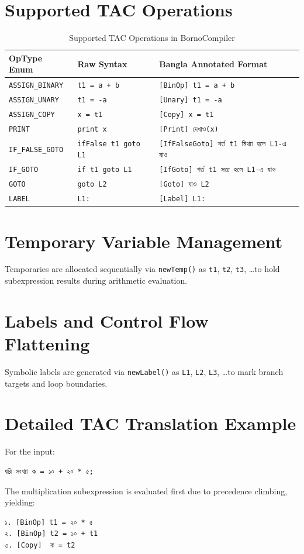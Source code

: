 \documentclass[12pt, a4paper]{report}
\begin{document}
\section{Supported TAC Operations}
\begin{table}[htbp]
\centering
\small
\renewcommand{\arraystretch}{1.25}
\begin{tabular}{|l|l|l|}
\hline
\textbf{OpType Enum} & \textbf{Raw Syntax} & \textbf{Bangla Annotated Format} \\
\hline
\texttt{ASSIGN\_BINARY} & \texttt{t1 = a + b} & \texttt{[BinOp] t1 = a + b} \\
\hline
\texttt{ASSIGN\_UNARY} & \texttt{t1 = -a} & \texttt{[Unary] t1 = -a} \\
\hline
\texttt{ASSIGN\_COPY} & \texttt{x = t1} & \texttt{[Copy] x = t1} \\
\hline
\texttt{PRINT} & \texttt{print x} & \texttt{[Print] দেখাও(x)} \\
\hline
\texttt{IF\_FALSE\_GOTO} & \texttt{ifFalse t1 goto L1} & \texttt{[IfFalseGoto] শর্ত t1 মিথ্যা হলে L1-এ যাও} \\
\hline
\texttt{IF\_GOTO} & \texttt{if t1 goto L1} & \texttt{[IfGoto] শর্ত t1 সত্য হলে L1-এ যাও} \\
\hline
\texttt{GOTO} & \texttt{goto L2} & \texttt{[Goto] যাও L2} \\
\hline
\texttt{LABEL} & \texttt{L1:} & \texttt{[Label] L1:} \\
\hline
\end{tabular}
\caption{Supported TAC Operations in BornoCompiler}
\label{tab:tac_ops}
\end{table}

\section{Temporary Variable Management}
Temporaries are allocated sequentially via \texttt{newTemp()} as \texttt{t1}, \texttt{t2}, \texttt{t3}, \dots to hold subexpression results during arithmetic evaluation.

\section{Labels and Control Flow Flattening}
Symbolic labels are generated via \texttt{newLabel()} as \texttt{L1}, \texttt{L2}, \texttt{L3}, \dots to mark branch targets and loop boundaries.

\section{Detailed TAC Translation Example}
For the input:
\begin{lstlisting}
ধরি সংখ্যা ক = ১০ + ২০ * ৫;
\end{lstlisting}
The multiplication subexpression is evaluated first due to precedence climbing, yielding:
\begin{lstlisting}
১. [BinOp] t1 = ২০ * ৫
২. [BinOp] t2 = ১০ + t1
৩. [Copy]  ক = t2
\end{lstlisting}
\end{document}
